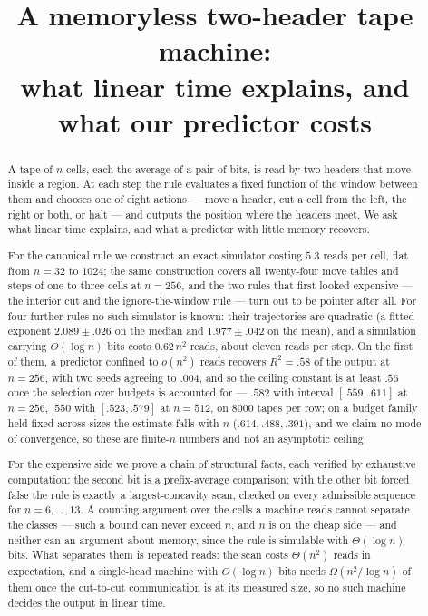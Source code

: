 \documentclass[11pt]{article}
\title{A memoryless two-header tape machine:\\
what linear time explains, and what our predictor costs}
\author{}
\date{}
\begin{document}
\maketitle

\begin{abstract}
A tape of $n$ cells, each the average of a pair of bits, is read by two headers that move inside a
region. At each step the rule evaluates a fixed function of the window between them and chooses one of
eight actions --- move a header, cut a cell from the left, the right or both, or halt --- and outputs
the position where the headers meet. We ask what linear time explains, and what a predictor with little
memory recovers.

For the canonical rule we construct an exact simulator costing $5.3$ reads per cell, flat from $n=32$
to $1024$; the same construction covers all twenty-four move tables and steps of one to three cells
at $n=256$, and the two rules that first looked expensive --- the interior cut and the
ignore-the-window rule --- turn out to be pointer after all. For four further rules no such simulator is known: their trajectories are quadratic (a fitted
exponent $2.089\pm.026$ on the median and $1.977\pm.042$ on the mean), and a simulation carrying
$O(\log n)$ bits costs $0.62\,n^2$ reads, about eleven reads per step. On the first of them, a predictor confined to $o(n^2)$ reads recovers $R^2=.58$ of the output at $n=256$, with two seeds agreeing to $.004$, and so the ceiling constant is at least $.56$ once the selection
over budgets is accounted for --- $.582$ with interval $[.559,.611]$ at $n=256$, $.550$ with
$[.523,.579]$ at $n=512$, on $8000$ tapes per row; on a budget family held fixed across sizes the
estimate falls with $n$ ($.614,.488,.391$), and we claim no mode of convergence, so these are
finite-$n$ numbers and not an asymptotic ceiling.

For the expensive side we prove a chain of structural facts, each verified by exhaustive computation: the second bit is a
prefix-average comparison; with the other bit forced false the rule is exactly a largest-concavity
scan, checked on every admissible sequence for $n=6,\dots,13$. A counting
argument over the cells a machine reads cannot separate the classes --- such a bound can never exceed $n$, and $n$ is
on the cheap side --- and neither can an argument about memory, since the rule is simulable with
$\Theta(\log n)$ bits. What separates them is repeated reads: the scan costs $\Theta(n^2)$ reads in
expectation, and a single-head machine with $O(\log n)$ bits needs $\Omega(n^2/\log n)$ of them once
the cut-to-cut communication is at its measured size, so no such machine decides the output in linear
time.

\end{abstract}
\end{document}
